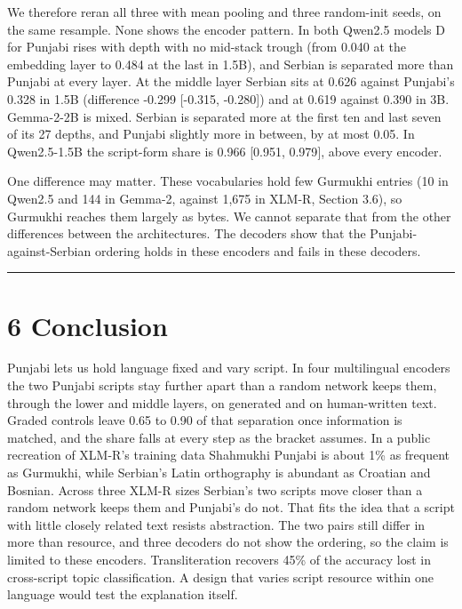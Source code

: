 We therefore reran all three with mean pooling and three random-init
seeds, on the same resample. None shows the encoder pattern. In both
Qwen2.5 models D for Punjabi rises with depth with no mid-stack trough
(from 0.040 at the embedding layer to 0.484 at the last in 1.5B), and
Serbian is separated more than Punjabi at every layer. At the middle
layer Serbian sits at 0.626 against Punjabi's 0.328 in 1.5B (difference
-0.299 {[}-0.315, -0.280{]}) and at 0.619 against 0.390 in 3B.
Gemma-2-2B is mixed. Serbian is separated more at the first ten and last
seven of its 27 depths, and Punjabi slightly more in between, by at most
0.05. In Qwen2.5-1.5B the script-form share is 0.966 {[}0.951, 0.979{]},
above every encoder.

One difference may matter. These vocabularies hold few Gurmukhi entries
(10 in Qwen2.5 and 144 in Gemma-2, against 1,675 in XLM-R, Section 3.6),
so Gurmukhi reaches them largely as bytes. We cannot separate that from
the other differences between the architectures. The decoders show that
the Punjabi-against-Serbian ordering holds in these encoders and fails
in these decoders.

\begin{center}\rule{0.5\linewidth}{0.5pt}\end{center}

\hypertarget{conclusion}{%
\section{6 Conclusion}\label{conclusion}}

Punjabi lets us hold language fixed and vary script. In four
multilingual encoders the two Punjabi scripts stay further apart than a
random network keeps them, through the lower and middle layers, on
generated and on human-written text. Graded controls leave 0.65 to 0.90
of that separation once information is matched, and the share falls at
every step as the bracket assumes. In a public recreation of XLM-R's
training data Shahmukhi Punjabi is about 1\% as frequent as Gurmukhi,
while Serbian's Latin orthography is abundant as Croatian and Bosnian.
Across three XLM-R sizes Serbian's two scripts move closer than a random
network keeps them and Punjabi's do not. That fits the idea that a
script with little closely related text resists abstraction. The two
pairs still differ in more than resource, and three decoders do not show
the ordering, so the claim is limited to these encoders. Transliteration
recovers 45\% of the accuracy lost in cross-script topic classification.
A design that varies script resource within one language would test the
explanation itself.

